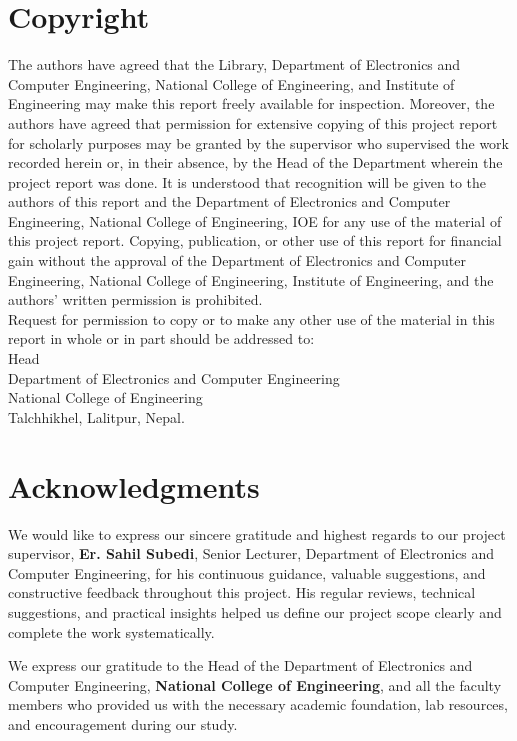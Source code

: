 \documentclass[12pt]{report}
\begin{document}
\newpage
\chapter*{Copyright}
The authors have agreed that the Library, Department of Electronics and Computer Engineering, National College of Engineering, and Institute of Engineering may make this report freely available for inspection. Moreover, the authors have agreed that permission for extensive copying of this project report for scholarly purposes may be granted by the supervisor who supervised the work recorded herein or, in their absence, by the Head of the Department wherein the project report was done. It is understood that recognition will be given to the authors of this report and the Department of Electronics and Computer Engineering, National College of Engineering, IOE for any use of the material of this project report. Copying, publication, or other use of this report for financial gain without the approval of the Department of Electronics and Computer Engineering, National College of Engineering, Institute of Engineering, and the authors' written permission is prohibited.\\

\noindent Request for permission to copy or to make any other use of the material in this report in whole or in part should be addressed to:\\[0.8cm]
Head\\
Department of Electronics and Computer Engineering\\
National College of Engineering\\
Talchhikhel, Lalitpur, Nepal.

\newpage
\chapter*{Acknowledgments}
We would like to express our sincere gratitude and highest regards to our project supervisor, \textbf{Er. Sahil Subedi}, Senior Lecturer, Department of Electronics and Computer Engineering, for his continuous guidance, valuable suggestions, and constructive feedback throughout this project. His regular reviews, technical suggestions, and practical insights helped us define our project scope clearly and complete the work systematically.

We express our gratitude to the Head of the Department of Electronics and Computer Engineering, \textbf{National College of Engineering}, and all the faculty members who provided us with the necessary academic foundation, lab resources, and encouragement during our study.
\end{document}
